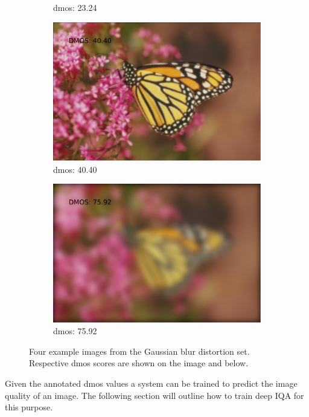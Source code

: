 \begin{figure}[H]
\begin{subfigure}[b]{0.4\textwidth}
        \caption{\gls{dmos}: 23.24}\label{fig:}
    \end{subfigure}
    \begin{subfigure}[b]{0.4\textwidth}
        \center
        \includegraphics[width=\textwidth]{Figs/Implementation/img103.pdf}
        \caption{\gls{dmos}: 40.40}\label{fig:}
    \end{subfigure}
    \begin{subfigure}[b]{0.4\textwidth}
	    \center
	    \includegraphics[width=\textwidth]{Figs/Implementation/img11.pdf}
	    \caption{\gls{dmos}: 75.92}\label{fig:}
    \end{subfigure}
    \caption{Four example images from the Gaussian blur distortion set. Respective \gls{dmos} scores are shown on the image and below.}
    \label{fig:gb_ex}
\end{figure} 

Given the annotated \gls{dmos} values a system can be trained to predict the image quality of an image. The following section will outline how to train deep IQA for this purpose.

